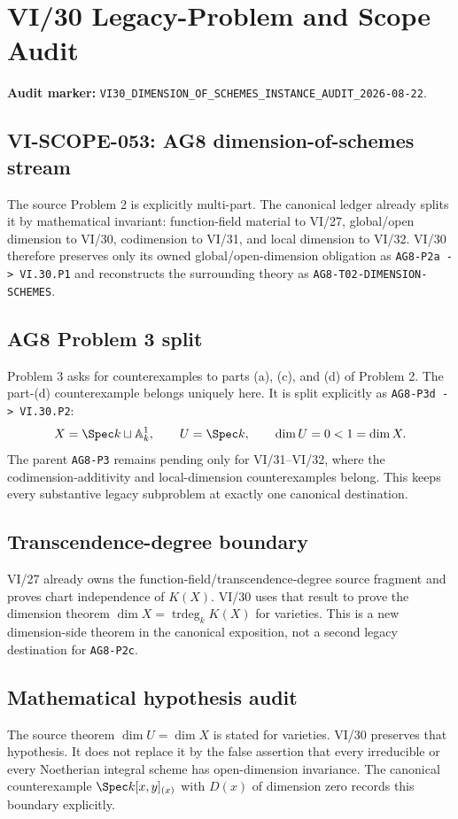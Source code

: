 \chapter*{VI/30 Legacy-Problem and Scope Audit}
\label{audit:vi30}

\textbf{Audit marker:} \texttt{VI30\_DIMENSION\_OF\_SCHEMES\_INSTANCE\_AUDIT\_2026-08-22}.

\section*{VI-SCOPE-053: AG8 dimension-of-schemes stream}
The source Problem 2 is explicitly multi-part.  The canonical ledger already splits it by mathematical invariant:
function-field material to VI/27, global/open dimension to VI/30, codimension to VI/31, and local dimension to VI/32.
VI/30 therefore preserves only its owned global/open-dimension obligation as \texttt{AG8-P2a -> VI.30.P1} and reconstructs
the surrounding theory as \texttt{AG8-T02-DIMENSION-SCHEMES}.

\section*{AG8 Problem 3 split}
Problem 3 asks for counterexamples to parts (a), (c), and (d) of Problem 2.  The part-(d) counterexample belongs
uniquely here.  It is split explicitly as \texttt{AG8-P3d -> VI.30.P2}:
\[
X=\Spec k\sqcup\mathbb A^1_k,\qquad U=\Spec k,
\qquad \dim U=0<1=\dim X.
\]
The parent \texttt{AG8-P3} remains pending only for VI/31--VI/32, where the codimension-additivity and local-dimension
counterexamples belong.  This keeps every substantive legacy subproblem at exactly one canonical destination.

\section*{Transcendence-degree boundary}
VI/27 already owns the function-field/transcendence-degree source fragment and proves chart independence of $K(X)$.
VI/30 uses that result to prove the dimension theorem $\dim X=\operatorname{trdeg}_kK(X)$ for varieties.  This is a
new dimension-side theorem in the canonical exposition, not a second legacy destination for \texttt{AG8-P2c}.

\section*{Mathematical hypothesis audit}
The source theorem $\dim U=\dim X$ is stated for varieties.  VI/30 preserves that hypothesis.  It does not replace it
by the false assertion that every irreducible or every Noetherian integral scheme has open-dimension invariance.
The canonical counterexample $\Spec k[x,y]_{(x)}$ with $D(x)$ of dimension zero records this boundary explicitly.
